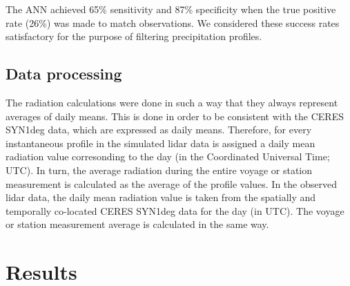 \documentclass[12pt,a4paper]{article}
\begin{document}
The ANN achieved 65\% sensitivity and 87\% speciﬁcity when the true positive
rate (26\%) was made to match observations. We considered these success rates
satisfactory for the purpose of filtering precipitation profiles.

\subsection{Data processing}

The radiation calculations were done in such a way that they always represent
averages of daily means. This is done in order to be consistent with the CERES
SYN1deg data, which are expressed as daily means. Therefore, for every
instantaneous profile in the simulated lidar data is assigned a daily mean
radiation value corresonding to the day (in the Coordinated Universal Time;
UTC). In turn, the average radiation during the entire voyage or station
measurement is calculated as the average of the profile values. In the observed
lidar data, the daily mean radiation value is taken from the spatially and
temporally co-located CERES SYN1deg data for the day (in UTC). The voyage or
station measurement average is calculated in the same way.

\section{Results}
\label{sec:results}
\end{document}

